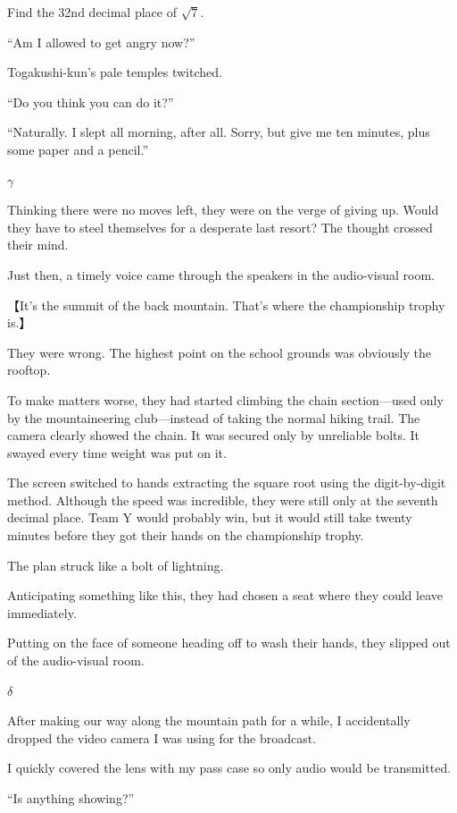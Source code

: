 \documentclass[
    a4paper,
    12pt,
    twoside,
    openany,
    UTF8,
    fontset=windows
]{ctexbook}
\begin{document}
\begin{center}
Find the 32nd decimal place of $\sqrt{7}$.
\end{center}

``Am I allowed to get angry now?''

Togakushi-kun's pale temples twitched.

``Do you think you can do it?''

``Naturally. I slept all morning, after all. Sorry, but give me ten minutes, plus some paper and a pencil.''

$\gamma$

Thinking there were no moves left, they were on the verge of giving up. Would they have to steel themselves for a desperate last resort? The thought crossed their mind.

Just then, a timely voice came through the speakers in the audio-visual room.

【It's the summit of the back mountain. That's where the championship trophy is.】

They were wrong. The highest point on the school grounds was obviously the rooftop.

To make matters worse, they had started climbing the chain section---used only by the mountaineering club---instead of taking the normal hiking trail. The camera clearly showed the chain. It was secured only by unreliable bolts. It swayed every time weight was put on it.

The screen switched to hands extracting the square root using the digit-by-digit method. Although the speed was incredible, they were still only at the seventh decimal place. Team Y would probably win, but it would still take twenty minutes before they got their hands on the championship trophy.

The plan struck like a bolt of lightning.

Anticipating something like this, they had chosen a seat where they could leave immediately.

Putting on the face of someone heading off to wash their hands, they slipped out of the audio-visual room.

$\delta$

After making our way along the mountain path for a while, I accidentally dropped the video camera I was using for the broadcast.

I quickly covered the lens with my pass case so only audio would be transmitted.

``Is anything showing?''
\end{document}
